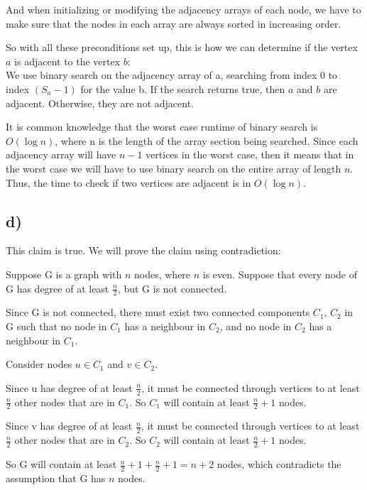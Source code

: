 \documentclass{article}
\begin{document}
And when initializing or modifying the adjacency arrays of each node, we have to make sure that the nodes in each array are always sorted in increasing order.

So with all these preconditions set up, this is how we can determine if the vertex $a$ is adjacent to the vertex $b$:\\
We use binary search on the adjacency array of a, searching from index 0 to index $(S_a-1)$ for the value b. If the search returns true, then $a$ and $b$ are adjacent. Otherwise, they are not adjacent.

It is common knowledge that the worst case runtime of binary search is $O(\log n)$, where n is the length of the array section being searched. Since each adjacency array will have $n-1$ vertices in the worst case, then it means that in the worst case we will have to use binary search on the entire array of length $n$.
Thus, the time to check if two vertices are adjacent is in $O(\log n)$.







\subsection*{d)}

This claim is true. We will prove the claim using contradiction:

Suppose G is a graph with $n$ nodes, where $n$ is even. Suppose that every node of G has degree of at least $\frac{n}{2}$, but G is not connected.

Since G is not connected, there must exist two connected components $C_1$, $C_2$ in G such that no node in $C_1$ has a neighbour in $C_2$, and no node in $C_2$ has a neighbour in $C_1$.

Consider nodes $u \in C_1$ and $v \in C_2$.

Since u has degree of at least $\frac{n}{2}$, it must be connected through vertices to at least $\frac{n}{2}$ other nodes that are in $C_1$. So $C_1$ will contain at least $\frac{n}{2} +1$ nodes.

Since v has degree of at least $\frac{n}{2}$, it must be connected through vertices to at least $\frac{n}{2}$ other nodes that are in $C_2$. So $C_2$ will contain at least $\frac{n}{2} +1$ nodes.

So G will contain at least $\frac{n}{2}+1+\frac{n}{2}+1 = n+2$ nodes, which contradicts the assumption that G has $n$ nodes.
\end{document}
